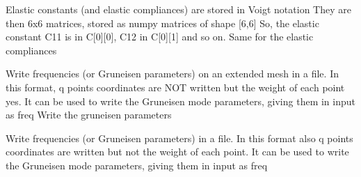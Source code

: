 \documentclass[letterpaper,10pt,english]{sphinxmanual}
\begin{document}

\begin{fulllineitems}
\label{pyqha:pyqha.write.write_celldmsT}
\end{fulllineitems}


\begin{fulllineitems}
\label{pyqha:pyqha.write.write_elastic_constants}
Elastic constants (and elastic compliances) are stored in Voigt notation 
They are then 6x6 matrices, stored as numpy matrices of shape {[}6,6{]}
So, the elastic constant C11 is in C{[}0{]}{[}0{]}, C12 in C{[}0{]}{[}1{]} and so on.
Same for the elastic compliances

\end{fulllineitems}


\begin{fulllineitems}
\label{pyqha:pyqha.write.write_freq}
Write frequencies (or Gruneisen parameters) on an extended mesh in a file.
In this format, q points coordinates are NOT written but the weight of each point yes.
It can be used to write the Gruneisen mode parameters, giving them in input as freq
Write the gruneisen parameters

\end{fulllineitems}


\begin{fulllineitems}
\label{pyqha:pyqha.write.write_freq_old}
Write frequencies (or Gruneisen parameters) in a file. In this format also q points
coordinates are written but not the weight of each point.
It can be used to write the Gruneisen mode parameters, giving them in input as freq

\end{fulllineitems}
\end{document}
